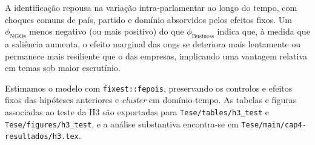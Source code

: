 A identificação repousa na variação intra-parlamentar ao longo do tempo, com choques comuns de país, partido e domínio absorvidos pelos efeitos fixos. Um \(\phi_{\text{NGOs}}\) menos negativo (ou mais positivo) do que \(\phi_{\text{Business}}\) indica que, à medida que a saliência aumenta, o efeito marginal das \acrshort{ong}s se deteriora mais lentamente ou permanece mais resiliente que o das empresas, implicando uma vantagem relativa em temas sob maior escrutínio.

Estimamos o modelo com \texttt{fixest::fepois}, preservando os controlos e efeitos fixos das hipóteses anteriores e \textit{cluster} em domínio-tempo. As tabelas e figuras associadas ao teste da H3 são exportadas para \texttt{Tese/tables/h3\_test} e \texttt{Tese/figures/h3\_test}, e a análise substantiva encontra-se em \texttt{Tese/main/cap4-resultados/h3.tex}.
